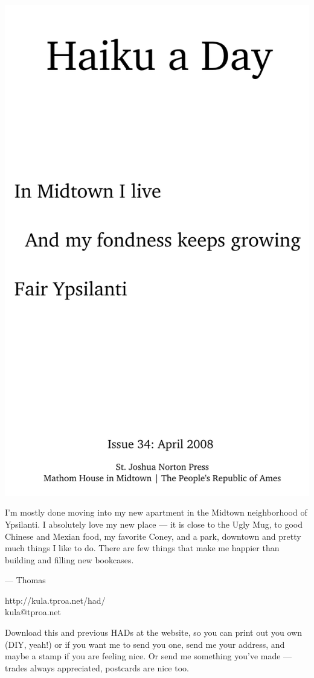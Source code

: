 \documentclass[12pt]{article}
\begin{document}
\includegraphics{frontpage.png}

\newpage

I'm mostly done moving into my new apartment in the Midtown neighborhood
of Ypsilanti. I absolutely love my new place --- it is close to the Ugly
Mug, to good Chinese and Mexian food, my favorite Coney, and a park,
downtown and pretty much things I like to do. There are few things that
make me happier than building and filling new bookcases.

--- Thomas

http://kula.tproa.net/had/ \\
kula@tproa.net

Download this and previous HADs at the website, so you can
print out you own (DIY, yeah!) or if you want me to send
you one, send me your address, and maybe a stamp if you
are feeling nice. Or send me something you've made ---
trades always appreciated, postcards are nice too.
\end{document}
